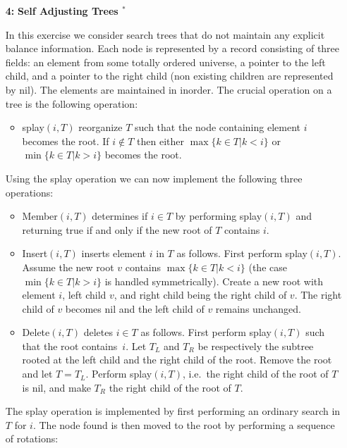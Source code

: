 \documentclass[11pt]{article}
\begin{document}
\begin{itemize}
\item[\bf 4:] {\bf Self Adjusting Trees $^*$}
  
  In this exercise we consider search trees that do not maintain any
  explicit balance information. Each node is represented by a record
  consisting of three fields: an element from some totally ordered
  universe, a pointer to the left child, and a pointer to the right
  child (non existing children are represented by \textsf{nil}). The
  elements are maintained in inorder. The crucial operation on a tree
  is the following operation:

  \begin{itemize}
  \item \textsf{splay}$(i,T)$ reorganize $T$ such that the node
    containing element $i$ becomes the root. If $i\not\in T$ then
    either $\max\{k\in T|k<i\}$ or $\min\{k\in T|k>i\}$ becomes the
    root.
  \end{itemize}
  
  Using the \textsf{splay} operation we can now implement the
  following three operations:

  \begin{itemize}
  \item \textsf{Member}$(i,T)$ determines if $i\in T$ by performing
    \textsf{splay}$(i,T)$ and returning true if and only if the new
    root of $T$ contains $i$.
  \item \textsf{Insert}$(i,T)$ inserts element $i$ in $T$ as follows.
    First perform \textsf{splay}$(i,T)$. Assume the new root $v$
    contains $\max\{k\in T|k<i\}$ (the case $\min\{k\in T|k>i\}$ is
    handled symmetrically). Create a new root with element $i$, left
    child $v$, and right child being the right child of $v$. The right
    child of $v$ becomes \textsf{nil} and the left child of $v$
    remains unchanged.
  \item \textsf{Delete}$(i,T)$ deletes $i\in T$ as follows. First
    perform \textsf{splay}$(i,T)$ such that the root contains~$i$. Let
    $T_L$ and $T_R$ be respectively the subtree rooted at the left child and
    the right child of the root.  Remove the root and let $T=T_L$. Perform
    \textsf{splay}$(i,T)$, i.e.\ the right child of the root of $T$ is
    \textsf{nil}, and make $T_R$ the right child of the root of $T$.
  \end{itemize}
  
  The \textsf{splay} operation is implemented by first performing an
  ordinary search in $T$ for $i$. The node found is then moved to the
  root by performing a sequence of rotations:


\end{itemize}
\end{document}

